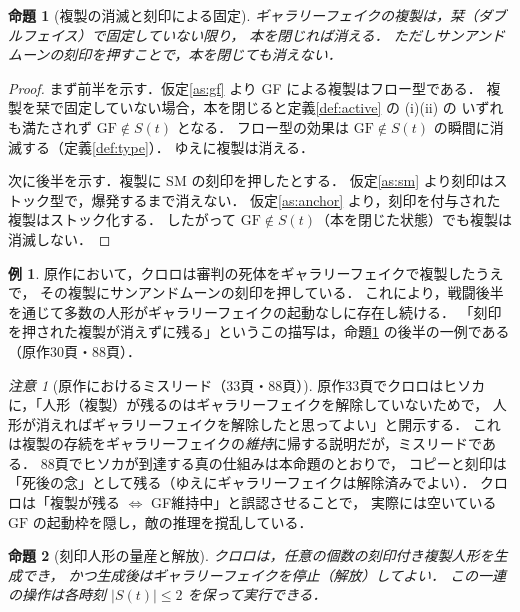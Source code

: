 \documentclass[a4paper,12pt]{jarticle}
\theoremstyle{definition}
\theoremstyle{plain}
\newtheorem{prop}{命題}
\theoremstyle{definition}
\newtheorem{ex}{例}
\theoremstyle{remark}
\newtheorem*{remark}{注意}
\newcommand{\Act}{S}   %
\newcommand{\GF}{\mathrm{GF}}    %
\newcommand{\SM}{\mathrm{SM}}    %
\begin{document}
\begin{prop}[複製の消滅と刻印による固定]\label{prop:anchor}
ギャラリーフェイクの複製は，栞（ダブルフェイス）で固定していない限り，
本を閉じれば消える．
ただしサンアンドムーンの{刻印}を押すことで，本を閉じても消えない．
\end{prop}

\begin{proof}
まず前半を示す．仮定\ref{as:gf} より GF による複製はフロー型である．
複製を栞で固定していない場合，本を閉じると定義\ref{def:active} の (i)(ii) の
いずれも満たされず $\GF\notin\Act(t)$ となる．
フロー型の効果は $\GF\notin\Act(t)$ の瞬間に消滅する（定義\ref{def:type}）．
ゆえに複製は消える．

次に後半を示す．複製に $\SM$ の刻印を押したとする．
仮定\ref{as:sm} より刻印はストック型で，爆発するまで消えない．
仮定\ref{as:anchor} より，刻印を付与された複製はストック化する．
したがって $\GF\notin\Act(t)$（本を閉じた状態）でも複製は消滅しない．
\end{proof}

\begin{ex}
原作において，クロロは審判の死体をギャラリーフェイクで複製したうえで，
その複製にサンアンドムーンの刻印を押している．
これにより，戦闘後半を通じて多数の人形がギャラリーフェイクの起動なしに存在し続ける．
「刻印を押された複製が消えずに残る」というこの描写は，命題\ref{prop:anchor} の後半の一例である（原作30頁・88頁）．
\end{ex}

\begin{remark}[原作におけるミスリード（33頁・88頁）]
原作33頁でクロロはヒソカに，「人形（複製）が残るのはギャラリーフェイクを解除していないためで，
人形が消えればギャラリーフェイクを解除したと思ってよい」と開示する．
これは複製の存続をギャラリーフェイクの\emph{維持}に帰する説明だが，ミスリードである．
88頁でヒソカが到達する真の仕組みは本命題のとおりで，
コピーと刻印は「死後の念」として残る（ゆえにギャラリーフェイクは解除済みでよい）．
クロロは「複製が残る $\Leftrightarrow$ GF維持中」と誤認させることで，
実際には空いている $\GF$ の起動枠を隠し，敵の推理を撹乱している．
\end{remark}

\begin{prop}[刻印人形の量産と解放]\label{prop:mass}
クロロは，任意の個数の刻印付き複製人形を生成でき，
かつ生成後はギャラリーフェイクを停止（解放）してよい．
この一連の操作は各時刻 $|\Act(t)|\le 2$ を保って実行できる．
\end{prop}
\end{document}
